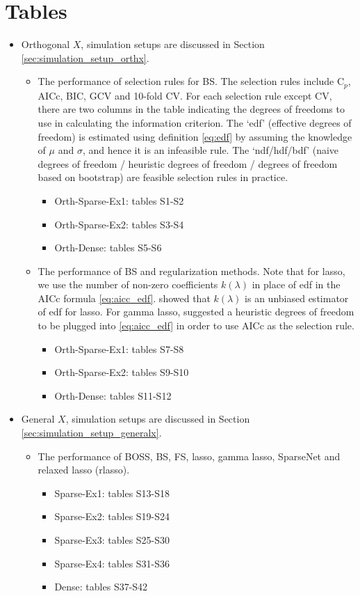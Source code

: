 \section{Tables}
\begin{itemize}
	\item Orthogonal $X$, simulation setups are discussed in Section \ref{sec:simulation_setup_orthx}. 
	\begin{itemize}
		\item The performance of selection rules for BS. The selection rules include C$_p$, AICc, BIC, GCV and 10-fold CV. For each selection rule except CV, there are two columns in the table indicating the degrees of freedoms to use in calculating the information criterion. The `edf' (effective degrees of freedom) is estimated using definition \eqref{eq:edf} by assuming the knowledge of $\mu$ and $\sigma$, and hence it is an infeasible rule. The `ndf/hdf/bdf' (naive degrees of freedom /  heuristic degrees of freedom / degrees of freedom based on bootstrap) are feasible selection rules in practice. 
		\begin{itemize}
			\item Orth-Sparse-Ex1: tables S1-S2
			\item Orth-Sparse-Ex2: tables S3-S4
			\item Orth-Dense: tables S5-S6
		\end{itemize}
		\item The performance of BS and regularization methods. Note that for lasso, we use the number of non-zero coefficients $k(\lambda)$ in place of edf in the AICc formula \eqref{eq:aicc_edf}.  showed that $k(\lambda)$ is an unbiased estimator of edf for lasso. For gamma lasso,  suggested a heuristic degrees of freedom to be plugged into \eqref{eq:aicc_edf} in order to use AICc as the selection rule.
		\begin{itemize}
			\item Orth-Sparse-Ex1: tables S7-S8
			\item Orth-Sparse-Ex2: tables S9-S10
			\item Orth-Dense: tables S11-S12
		\end{itemize}
	\end{itemize}
	\item General $X$, simulation setups are discussed in Section \ref{sec:simulation_setup_generalx}. 
	\begin{itemize}
		\item The performance of BOSS, BS, FS, lasso, gamma lasso, SparseNet and relaxed lasso (rlasso).
		\begin{itemize}
			\item Sparse-Ex1: tables S13-S18
			\item Sparse-Ex2: tables S19-S24
			\item Sparse-Ex3: tables S25-S30
			\item Sparse-Ex4: tables S31-S36
			\item Dense: tables S37-S42
		\end{itemize}
	\end{itemize}
\end{itemize}

